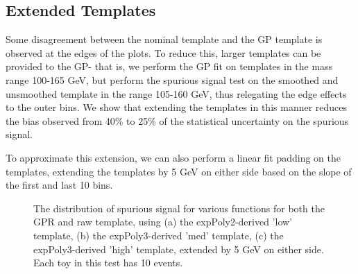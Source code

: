 \subsection{Extended Templates}

Some disagreement between the nominal template and the GP template is observed at the edges of the plots. To reduce this, larger templates can be provided to the GP- that is, we perform the GP fit on templates in the mass range 100-165 GeV, but perform the spurious signal test on the smoothed and unsmoothed template in the range 105-160 GeV, thus relegating the edge effects to the outer bins. We show that extending the templates in this manner reduces the bias observed from 40\% to 25\% of the statistical uncertainty on the spurious signal.

To approximate this extension, we can also perform a linear fit padding on the templates, extending the templates by 5 GeV on either side based on the slope of the first and last 10 bins. 

\begin{figure} 
\begin{center}

\caption{The distribution of spurious signal for various functions for both the GPR and raw template, using (a) the expPoly2-derived 'low' template, (b) the expPoly3-derived 'med' template, (c) the expPoly3-derived 'high' template, extended by 5 GeV on either side. Each toy in this test has 10 events.}
\label{fig:padded_lowpt_10_noSig}
\end{center}
\end{figure}

